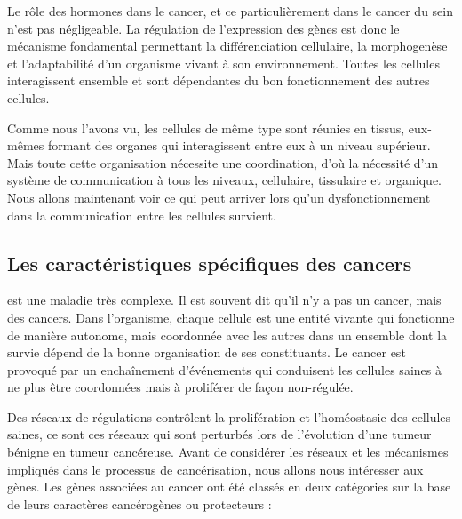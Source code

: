 			Le rôle des hormones dans le cancer, et ce particulièrement dans le cancer du sein n'est pas négligeable.
			La régulation de l'expression des gènes est donc le mécanisme fondamental permettant la différenciation cellulaire, la morphogenèse et l'adaptabilité d'un organisme vivant à son environnement.
			Toutes les cellules interagissent ensemble et sont dépendantes du bon fonctionnement des autres cellules.

			Comme nous l'avons vu, les cellules de même type sont réunies en tissus, eux-mêmes formant des organes qui interagissent entre eux à un niveau supérieur.
			Mais toute cette organisation nécessite une coordination, d'où la nécessité d'un système de communication à tous les niveaux, cellulaire, tissulaire et organique.
			Nous allons maintenant voir ce qui peut arriver lors qu'un dysfonctionnement dans la communication entre les cellules survient.

		\subsection{\textcolor{red!45!black}{Les caractéristiques spécifiques des cancers}}\label{sub:caract}

			 est une maladie très complexe.
			Il est souvent dit qu'il n'y a pas un cancer, mais des cancers.
			Dans l'organisme, chaque cellule est une entité vivante qui fonctionne de manière autonome, mais coordonnée avec les autres dans un ensemble dont la survie dépend de la bonne organisation de ses constituants.
			Le cancer est provoqué par un enchaînement d'événements qui conduisent les cellules saines à ne plus être coordonnées mais à proliférer de façon non-régulée.

			Des réseaux de régulations contrôlent la prolifération et l'homéostasie des cellules saines, ce sont ces réseaux qui sont perturbés lors de l'évolution d'une tumeur bénigne en tumeur cancéreuse.
			Avant de considérer les réseaux et les mécanismes impliqués dans le processus de cancérisation, nous allons nous intéresser aux gènes.
			Les gènes associées au cancer ont été classés en deux catégories sur la base de leurs caractères cancérogènes ou protecteurs :

